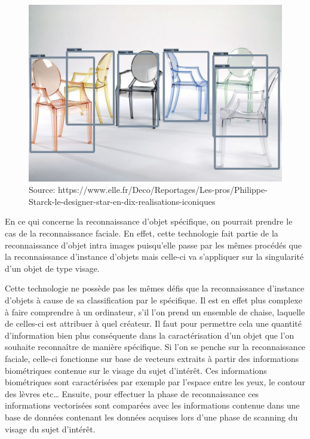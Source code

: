 \documentclass[a4paper,12pt]{article} %
\begin{document}
\newline
\begin{figure}[h] %
  \centering %
  \includegraphics[scale=0.2]{output.png} %
  \caption{Source: https://www.elle.fr/Deco/Reportages/Les-pros/Philippe-Starck-le-designer-star-en-dix-realisations-iconiques } %
\end{figure}
\newpage
\par
En ce qui concerne la reconnaissance d’objet spécifique, on pourrait prendre le cas de la reconnaissance faciale. En effet, cette technologie fait partie de la reconnaissance d’objet intra images puisqu’elle passe par les mêmes procédés que la reconnaissance d’instance d’objets mais celle-ci va s’appliquer sur la singularité d’un objet de type visage. 
\newline
\par
Cette technologie ne possède pas les mêmes défis que la reconnaissance d’instance d’objets à cause de sa classification par le spécifique. Il est en effet plus complexe à faire comprendre à un ordinateur, s’il l’on prend un ensemble de chaise, laquelle de celles-ci est attribuer à quel créateur. Il faut pour permettre cela une quantité d’information bien plus conséquente dans la caractérisation d’un objet que l’on souhaite reconnaître de manière spécifique. Si l’on se penche sur la reconnaissance faciale, celle-ci fonctionne sur base de vecteurs extraits à partir des informations biométriques contenue sur le visage du sujet d’intérêt. Ces informations biométriques sont caractérisées par exemple par l’espace entre les yeux, le contour des lèvres etc… Ensuite, pour effectuer la phase de reconnaissance ces informations vectorisées sont comparées avec les informations contenue dans une base de données contenant les données acquises lors d’une phase de scanning du visage du sujet d’intérêt. 
\end{document}
